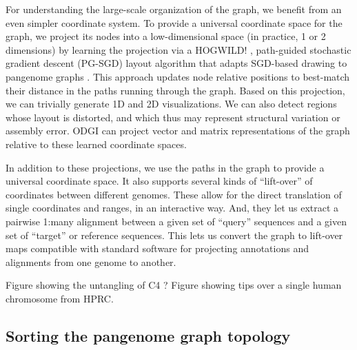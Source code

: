 \documentclass{bioinfo}
\begin{document}
For understanding the large-scale organization of the graph, we benefit from an even simpler coordinate system.
To provide a universal coordinate space for the graph, we project its nodes into a low-dimensional space (in practice, 1 or 2 dimensions) by learning the projection via a HOGWILD! \citep{niu2011hogwild}, path-guided stochastic gradient descent (PG-SGD) layout algorithm that adapts SGD-based drawing to pangenome graphs \citep{zheng2018graph}.
This approach updates node relative positions to best-match their distance in the paths running through the graph.
Based on this projection, we can trivially generate 1D and 2D visualizations.
We can also detect regions whose layout is distorted, and which thus may represent structural variation or assembly error.
ODGI can project vector and matrix representations of the graph relative to these learned coordinate spaces.

In addition to these projections, we use the paths in the graph to provide a universal coordinate space.
It also supports several kinds of ``lift-over'' of coordinates between different genomes.
These allow for the direct translation of single coordinates and ranges, in an interactive way.
And, they let us extract a pairwise 1:many alignment between a given set of ``query'' sequences and a given set of ``target'' or reference sequences.
This lets us convert the graph to lift-over maps compatible with standard software for projecting annotations and alignments from one genome to another.




Figure showing the untangling of C4 ?
Figure showing tips over a single human chromosome from HPRC.

\subsection{Sorting the pangenome graph topology}
\label{sec:sort}



\end{document}
